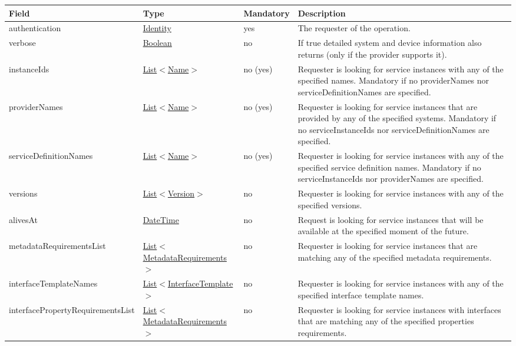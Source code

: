 \documentclass[a4paper]{arrowhead}
\newcommand{\pref}[1]{{\textcolor{ArrowheadGrey}{\hyperref[sec:model:primitives:#1]{#1}}}}
\begin{document}
\clearpage

\label{sec:model:ServiceLookupRequest}

\begin{table}[ht!]
\begin{tabularx}{\textwidth}{| p{5.3cm} | p{4.8cm} | p{2cm} | X |} \hline
\rowcolor{gray!33} Field & Type & Mandatory & Description \\ \hline
authentication & \hyperref[sec:model:Identity]{Identity} & yes & The requester of the ope\-ration. \\ \hline
verbose & \pref{Boolean} & no & If true detailed system and device information also returns (only if the provider supports it). \\ \hline
instanceIds &  \pref{List}$<$\pref{Name}$>$ & no (yes) & Requester is looking for service instances with any of the spe\-cified names. Mandatory if no providerNames nor serviceDefinitionNames are spe\-cified. \\ \hline
providerNames &  \pref{List}$<$\pref{Name}$>$ & no (yes) & Requester is looking for service ins\-tances that are provided by any of the specified systems. Mandatory if no serviceInstanceIds nor serviceDefinitionNames are spe\-cified. \\ \hline
serviceDefinitionNames &  \pref{List}$<$\pref{Name}$>$ & no (yes) & Requester is looking for service ins\-tances with any of the specified service definition names. Mandatory if no serviceInstanceIds nor providerNames are spe\-cified. \\ \hline
versions &  \pref{List}$<$\pref{Version}$>$ & no & Requester is looking for service ins\-tances with any of the specified versions. \\ \hline
alivesAt & \pref{DateTime} & no & Request is looking for service ins\-tances that will be available at the specified moment of the future. \\ \hline
metadataRequirementsList & \pref{List}$<$\hyperref[sec:model:MetadataRequirements]{MetadataRequirements}$>$ & no & Requester is looking for service ins\-tances that are matching any of the specified metadata requirements.  \\ \hline
interfaceTemplateNames &  \pref{List}$<$\pref{InterfaceTemplate}$>$ & no & Requester is looking for service ins\-tances with any of the specified interface template names. \\ \hline
interfacePropertyRequirementsList & \pref{List}$<$\hyperref[sec:model:MetadataRequirements]{MetadataRequirements}$>$ & no & Requester is looking for service ins\-tances with interfaces that are matching any of the specified properties requirements.  \\ \hline
\end{tabularx}
\end{table}
\end{document}
